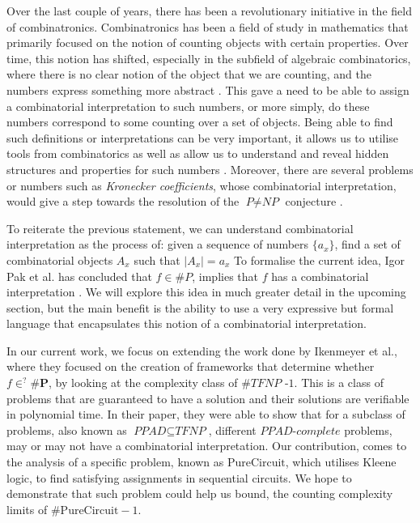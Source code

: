 Over the last couple of years, there has been a revolutionary
initiative in the field of combinatronics.
Combinatronics has been a field of study in mathematics that primarily focused on
the notion of counting objects with certain properties. Over time, this notion
has shifted, especially in the subfield of algebraic combinatorics, where
there is no clear notion of the object that we are counting,
and the numbers express something more abstract \cite{pakWhatCombinatorialInterpretation2022}. %
This gave a need to be able to assign a combinatorial interpretation to such numbers, or
more simply, do these numbers correspond to some counting over a set of objects.
Being able to find such definitions or interpretations can be very important,
it allows us to utilise tools from combinatorics as well as allow us to understand
and reveal hidden structures and properties for such numbers \cite{pakWhatCombinatorialInterpretation2022}. 
Moreover, there are several problems or numbers such as \textit{Kronecker coefficients},
whose combinatorial interpretation, would give a step towards the resolution of the $\textit{P} \neq \textit{NP}$
conjecture \cite{ikenmeyerWhatWhatNot2022a}.


To reiterate the previous statement, we can understand combinatorial interpretation as
the process of: given a sequence of numbers $\{a_x\}$,
find a set of combinatorial objects $A_x$ such that $|A_x| = a_x$
To formalise the current idea, Igor Pak et al. has concluded that
$f \in \textit{\#P}$, implies that $f$ has a combinatorial interpretation
\cite{pakWhatCombinatorialInterpretation2022, ikenmeyerWhatWhatNot2022a}.
We will explore this idea in much greater detail in the upcoming section,
but the main benefit is the ability to use a very expressive but formal language
that encapsulates this notion of a combinatorial interpretation.


In our current work, we focus on extending the work done by
Ikenmeyer et al., where they focused on the creation of frameworks
that determine whether $f \in^? \textbf{\#P}$, by looking
at the complexity class of $\textbf{\#}\textit{TFNP -1}$.
This is a class of problems that are guaranteed to have a solution
and their solutions are verifiable in polynomial time.
In their paper, they were able to show that for a subclass of
problems, also known as $\textit{PPAD} \subseteq \textit{TFNP}$,
different $\textit{PPAD-complete}$ problems, may or may not have a combinatorial
interpretation. Our contribution, comes to the analysis of a specific
problem, known as $\text{PureCircuit}$, which utilises
Kleene logic, to find satisfying assignments in sequential circuits.
We hope to demonstrate that such problem could help us bound, the
counting complexity limits of $\textbf{\#}\text{PureCircuit} -1$.

